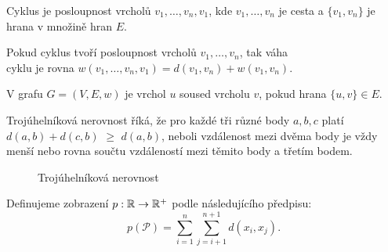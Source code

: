\begin{definition}[Cyklus]
  \label{definice:cyklus}
  Cyklus je posloupnost vrcholů $v_1,\ldots,v_n,v_1$, kde $v_1,\ldots,v_n$ je cesta a  $\{v_1,v_n\}$ je hrana v množině hran $E$.
\end{definition}

\begin{definition}
  \label{definice:vaha_cyklu}
  Pokud cyklus tvoří posloupnost vrcholů $v_1, \ldots, v_n$, tak váha \\cyklu je rovna $w(v_1,\dots ,v_n, v_1) = d(v_1, v_n) + w(v_1, v_n)$.
\end{definition}

\begin{definition}[Soused]
  \label{definice:soused}
  V grafu $G = (V, E, w)$ je vrchol $u$ soused vrcholu $v$, pokud hrana $\{u, v\} \in E$.
\end{definition}

\begin{tvrzeni}
  \label{tvrzeni:trojuhelnikova_nerovnost}
  Trojúhelníková nerovnost říká, že pro kaž\-dé tři různé body $a, b, c$ platí \textcolor{myblue}{$d(a, b)+d(c, b)$} $\geq$ \textcolor{myred}{$d(a,b)$}, neboli vzdálenost mezi dvěma body je vždy menší nebo rovna součtu vzdáleností mezi těmito body a třetím bodem.

  \begin{figure}[h]
    \centering
    \caption{Trojúhelníková nerovnost}
  \end{figure}
\end{tvrzeni}

\begin{definition}
  \label{definice:obvod_troj}
  Definujeme zobrazení $p: \mathbb{R}\rightarrow \mathbb{R}^+$ podle následujícího předpisu: \[ p(\mathcal{P}) = \sum_{i=1}^{n} \sum_{j=i+1}^{n+1}d(x_i, x_{j}). \]

\end{definition}

